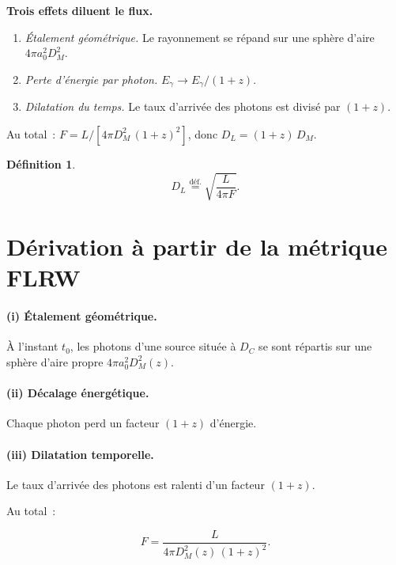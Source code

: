 \documentclass[11pt,a4paper,openany]{report}
\newcommand{\eqdef}{\stackrel{\text{déf.}}{=}}
\newtheorem{definition}[theorem]{Définition}
\begin{document}
\begin{tcolorbox}[mathspe]
\textbf{Trois effets diluent le flux.}
\begin{enumerate}[topsep=2pt]
\item \emph{Étalement géométrique.} Le rayonnement se répand sur une sphère
  d'aire $4\pi a_{0}^{2} D_{M}^{2}$.
\item \emph{Perte d'énergie par photon.} $E_{\gamma} \to E_{\gamma}/(1+z)$.
\item \emph{Dilatation du temps.} Le taux d'arrivée des photons est divisé
  par $(1+z)$.
\end{enumerate}
Au total~: $F = L/[4\pi D_{M}^{2}\,(1+z)^{2}]$, donc
$D_{L} = (1+z)\,D_{M}$.
\end{tcolorbox}

\begin{definition}
\begin{equation}
D_{L} \eqdef \sqrt{\frac{L}{4\pi F}}.
\label{eq:DL_def}
\end{equation}
\end{definition}

\section{Dérivation à partir de la métrique FLRW}

\paragraph{(i) Étalement géométrique.} À l'instant $t_0$, les photons d'une
source située à $D_{C}$ se sont répartis sur une sphère d'aire propre
$4\pi a_{0}^{2} D_{M}^{2}(z)$.

\paragraph{(ii) Décalage énergétique.} Chaque photon perd un facteur $(1+z)$
d'énergie.

\paragraph{(iii) Dilatation temporelle.} Le taux d'arrivée des photons est
ralenti d'un facteur $(1+z)$.

\noindent Au total~:

\begin{equation}
F = \frac{L}{4\pi D_{M}^{2}(z)\,(1+z)^{2}}.
\label{eq:F_obs}
\end{equation}
\end{document}
